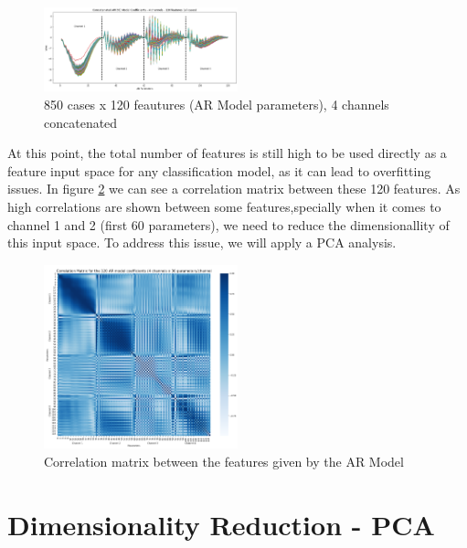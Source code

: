 \documentclass[twocolumn]{article}
\begin{document}
\begin{figure}[H]
      \centering
      \includegraphics[width=0.5\textwidth]{ar_1.png}
      \caption{850 cases x 120 feautures (AR Model parameters), 4 channels concatenated}
      \label{fig:ar1}
\end{figure}

At this point, the total number of features is still high to be used directly as a feature input space for any classification model, as it can lead to overfitting issues. In figure \ref{fig:ar2} we can see a correlation matrix between these 120 features. As high correlations are shown between some features,specially when it comes to channel 1 and 2 (first 60 parameters), we need to reduce the dimensionallity of this input space. To address this issue, we will apply a PCA analysis.

\begin{figure}[H]
      \centering
      \includegraphics[width=0.5\textwidth]{ar_2.png}
      \caption{Correlation matrix between the features given by the AR Model}
      \label{fig:ar2}
\end{figure}


\section{Dimensionality Reduction - PCA}
\end{document}

